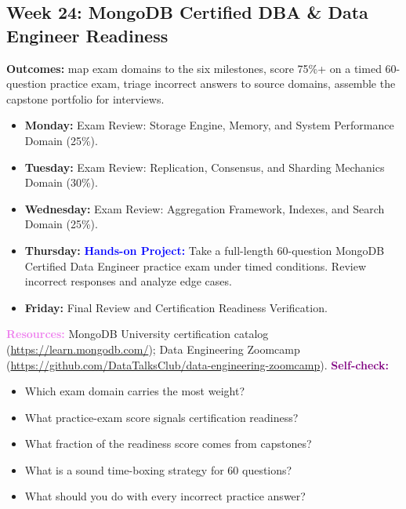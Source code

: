 \documentclass[11pt, a4paper]{article}
\newcommand{\project}[1]{\textbf{\textcolor{blue}{Hands-on Project:}} #1}
\newcommand{\dayitem}[2]{\item \textbf{#1:} #2}
\newcommand{\selfcheck}[1]{\vspace{1mm}\noindent\textbf{\textcolor{purple}{Self-check:}} #1}
\newcommand{\resources}[1]{\vspace{1mm}\noindent\textbf{\textcolor{violet}{Resources:}} #1}
\begin{document}
\subsection*{Week 24: MongoDB Certified DBA \& Data Engineer Readiness}
\par\noindent\textbf{Outcomes:} map exam domains to the six milestones, score 75\%+ on a timed 60-question practice exam, triage incorrect answers to source domains, assemble the capstone portfolio for interviews.
\begin{itemize}[label=-]
    \dayitem{Monday}{Exam Review: Storage Engine, Memory, and System Performance Domain (25\%).}
    \dayitem{Tuesday}{Exam Review: Replication, Consensus, and Sharding Mechanics Domain (30\%).}
    \dayitem{Wednesday}{Exam Review: Aggregation Framework, Indexes, and Search Domain (25\%).}
    \dayitem{Thursday}{\project{Take a full-length 60-question MongoDB Certified Data Engineer practice exam under timed conditions. Review incorrect responses and analyze edge cases.}}
    \dayitem{Friday}{Final Review and Certification Readiness Verification.}
\end{itemize}
\resources{MongoDB University certification catalog (\url{https://learn.mongodb.com/}); Data Engineering Zoomcamp (\url{https://github.com/DataTalksClub/data-engineering-zoomcamp}).}
\selfcheck{\begin{itemize}[label=-, itemsep=0pt, leftmargin=1.5em]
    \item Which exam domain carries the most weight?
    \item What practice-exam score signals certification readiness?
    \item What fraction of the readiness score comes from capstones?
    \item What is a sound time-boxing strategy for 60 questions?
    \item What should you do with every incorrect practice answer?
\end{itemize}}
\end{document}
